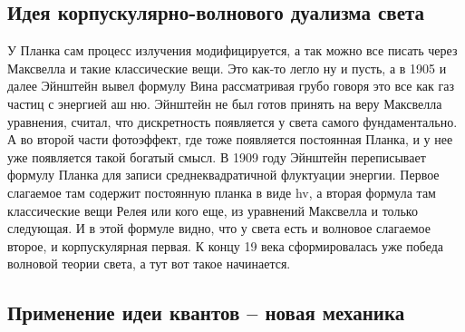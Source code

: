 \documentclass[a4paper, 12pt]{article}
\begin{document}
\subsection{Идея корпускулярно-волнового дуализма света}

У Планка сам процесс излучения модифицируется, а так можно все писать 
через Максвелла и такие классические вещи. Это как-то легло ну и пусть, 
а в 1905 и далее Эйнштейн вывел формулу Вина рассматривая грубо говоря 
это все как газ частиц с энергией аш ню. Эйнштейн не был готов принять 
на веру Максвелла уравнения, считал, что дискретность появляется у света 
самого фундаментально. А во второй части фотоэффект, где тоже появляется 
постоянная Планка, и у нее уже появляется такой богатый смысл. В 1909 
году Эйнштейн переписывает формулу Планка для записи среднеквадратичной 
флуктуации энергии. Первое слагаемое там содержит постоянную планка 
в виде hv, а вторая формула там классические вещи Релея или кого еще, из 
уравнений Максвелла и только следующая. И в этой формуле видно, что 
у света есть и волновое слагаемое второе, и корпускулярная первая. 
К концу 19 века сформировалась уже победа волновой теории света, а тут 
вот такое начинается.

\subsection{Применение идеи квантов -- новая механика}
\end{document}
